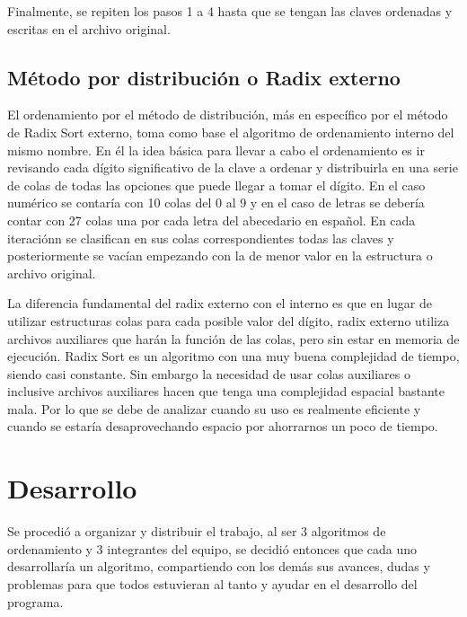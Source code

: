 \documentclass[letter]{report}
\begin{document}
Finalmente, se repiten los pasos 1 a 4 hasta que se tengan las claves ordenadas y escritas en el archivo original.

\subsection*{Método por distribución o Radix externo}
\noindent El ordenamiento por el método de distribución, más en específico por el método de Radix Sort externo, toma como base el algoritmo de ordenamiento interno del mismo nombre. En él la idea básica para llevar a cabo el ordenamiento es ir revisando cada dígito significativo de la clave a ordenar y distribuirla en una serie de colas de todas las opciones que puede llegar a tomar el dígito. En el caso numérico se contaría con 10 colas del 0 al 9 y en el caso de letras se debería contar con 27 colas una por cada letra del abecedario en español. En cada iteraciónn se clasifican en sus colas correspondientes todas las claves y posteriormente se vacían empezando con la de menor valor en la estructura o archivo original.\medskip

La diferencia fundamental del radix externo con el interno es que en lugar de utilizar estructuras colas para cada posible valor del dígito, radix externo utiliza archivos auxiliares que harán la función de las colas, pero sin estar en memoria de ejecución. Radix Sort es un algoritmo con una muy buena complejidad de tiempo, siendo casi constante. Sin embargo la necesidad de usar colas auxiliares o inclusive archivos auxiliares hacen que tenga una complejidad espacial bastante mala. Por lo que se debe de analizar cuando su uso es realmente eficiente y cuando se estaría desaprovechando espacio por ahorrarnos un poco de tiempo.

\clearpage
{}
\section*{Desarrollo}


Se procedió a organizar y distribuir el trabajo, al ser 3 algoritmos de ordenamiento y 3 integrantes del equipo, se decidió entonces que cada uno desarrollaría un algoritmo, compartiendo con los demás sus avances, dudas y problemas para que todos estuvieran al tanto y ayudar en el desarrollo del programa.
\end{document}
